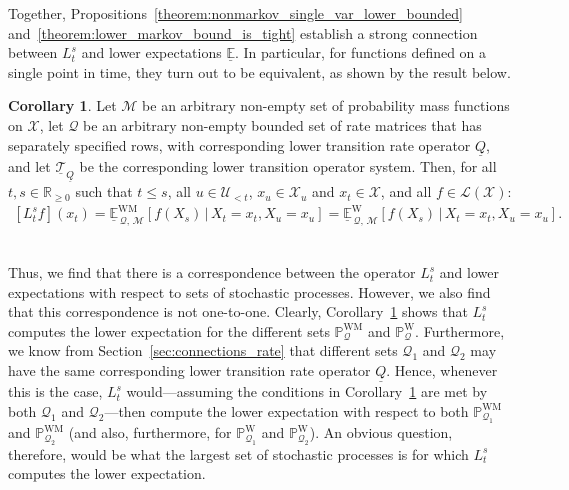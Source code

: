 \documentclass[10pt,a4paper]{paper}
\theoremstyle{definition}
\newtheorem{corollary}[theorem]{Corollary}
\newcommand{\reals}{\mathbb{R}}
\newcommand{\realsnonneg}{\reals_{\geq 0}}
\newcommand{\states}{\mathcal{X}}
\newcommand{\processes}{\mathbb{P}}
\newcommand{\wprocesses}{\processes^{\mathrm{W}}}
\newcommand{\wmprocesses}{\processes^{\mathrm{WM}}}
\newcommand{\gambles}{\mathcal{L}}
\newcommand{\gamblesX}{\gambles(\states)}
\newcommand{\rateset}{\mathcal{Q}}
\newcommand{\lrate}{\underline{Q}}
\begin{document}
Together, Propositions~\ref{theorem:nonmarkov_single_var_lower_bounded} and~\ref{theorem:lower_markov_bound_is_tight} establish a strong connection between $L_t^s$ and lower expectations $\underline{\mathbb{E}}$. In particular, for functions defined on a single point in time, they turn out to be equivalent, as shown by the result below.

\begin{corollary}\label{cor:lower_operator_is_infimum}
Let $\mathcal{M}$ be an arbitrary non-empty set of probability mass functions on $\states$, let $\rateset$ be an arbitrary non-empty bounded set of rate matrices that has separately specified rows, with corresponding lower transition rate operator $\lrate$, and let $\underline{\mathcal{T}}_{\lrate}$ be the corresponding lower transition operator system. Then, for all $t,s\in\realsnonneg$ such that $t\leq s$, all $u\in\mathcal{U}_{<t}$, $x_u\in\states_u$ and $x_t\in\states$, and all $f\in\gamblesX$:
\begin{align*}
\left[L_t^sf\right](x_t) = \underline{\mathbb{E}}^{\mathrm{WM}}_{\,\rateset,\,\mathcal{M}}[f(X_s)\,\vert\,X_t=x_t,X_u=x_u] 
=
\underline{\mathbb{E}}^{\mathrm{W}}_{\,\rateset,\,\mathcal{M}}[f(X_s)\,\vert\,X_t=x_t,X_u=x_u].
\end{align*}\\[-25pt]
\end{corollary}

Thus, we find that there is a correspondence between the operator $L_t^s$ and lower expectations with respect to sets of stochastic processes. However, we also find that this correspondence is not one-to-one. Clearly, Corollary~\ref{cor:lower_operator_is_infimum} shows that $L_t^s$ computes the lower expectation for the different sets $\wmprocesses_\rateset$ and $\wprocesses_\rateset$. Furthermore, we know from Section~\ref{sec:connections_rate} that different sets $\rateset_1$ and $\rateset_2$ may have the same corresponding lower transition rate operator $\lrate$. Hence, whenever this is the case, $L_t^s$ would---assuming the conditions in Corollary~\ref{cor:lower_operator_is_infimum} are met by both $\rateset_1$ and $\rateset_2$---then compute the lower expectation with respect to both $\wmprocesses_{\rateset_1}$ and $\wmprocesses_{\rateset_2}$ (and also, furthermore, for $\wprocesses_{\rateset_1}$ and $\wprocesses_{\rateset_2}$). An obvious question, therefore, would be what the largest set of stochastic processes is for which $L_t^s$ computes the lower expectation.
\end{document}
